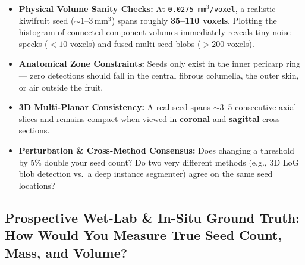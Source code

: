\documentclass[10pt,a4paper]{article}
\newcommand{\ghblob}{https://github.com/arvidl/BMED365-2027/blob/main}
\begin{document}
\begin{itemize}
\begin{enumerate}
        \item \textbf{Verify, edit, or add a second wedge (in ITK-SNAP/Slicer, FreeSurfer \texttt{freeview}, or Notebook~\texttt{03b}):} Use the 3D paintbrush/polygon tool --- or launch FreeSurfer \texttt{freeview} directly on macOS via \href{\ghblob/Lab4-Comp-Imag/Kiwi-challenge/scripts/view_kiwi_freeview.sh}{\nolinkurl{scripts/view_kiwi_freeview.sh}} (\texttt{--with-pred --3d} also overlays the bit-aligned Neurosymbolic whole-fruit 3D prediction with custom \href{\ghblob/Lab4-Comp-Imag/Kiwi-challenge/scripts/kiwi_seeds_ColorLUT.txt}{\nolinkurl{kiwi_seeds_ColorLUT.txt}}, and \texttt{--gt <path>} opens a personal working copy), or use the zero-install Jupyter-Widget 3D tri-planar editor in \href{\ghblob/Lab4-Comp-Imag/Kiwi-challenge/notebooks/03b-kiwi-interactive-gt-and-interrater.ipynb}{\nolinkurl{03b-kiwi-interactive-gt-and-interrater.ipynb}} --- to refine boundary voxels, save personal rater NIfTI masks to \texttt{MyStuff/kiwi-gt/}, measure \textbf{inter-rater Dice / Cohen's $\kappa$ / Instance F1}, and build a multi-rater \textbf{STAPLE consensus} standard.
    \end{enumerate}
    \item \textbf{Physical Volume Sanity Checks:} At \texttt{0.0275\,mm$^3$/voxel}, a realistic kiwifruit seed ($\sim$1--3\,mm$^3$) spans roughly \textbf{35--110 voxels}. Plotting the histogram of connected-component volumes immediately reveals tiny noise specks ($<10$ voxels) and fused multi-seed blobs ($>200$ voxels).
    \item \textbf{Anatomical Zone Constraints:} Seeds only exist in the inner pericarp ring --- zero detections should fall in the central fibrous columella, the outer skin, or air outside the fruit.
    \item \textbf{3D Multi-Planar Consistency:} A real seed spans $\sim$3--5 consecutive axial slices and remains compact when viewed in \textbf{coronal} and \textbf{sagittal} cross-sections.
    \item \textbf{Perturbation \& Cross-Method Consensus:} Does changing a threshold by 5\% double your seed count? Do two very different methods (e.g., 3D LoG blob detection vs.\ a deep instance segmenter) agree on the same seed locations?
\end{itemize}

\subsection{Prospective Wet-Lab \& In-Situ Ground Truth: How Would You Measure True Seed Count, Mass, and Volume?}
\end{document}
